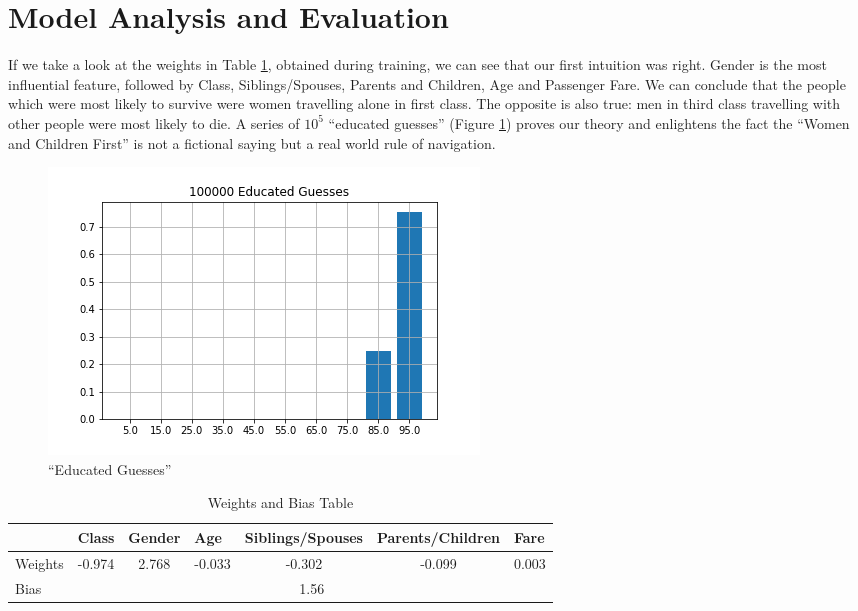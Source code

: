 \documentclass[10pt,a4paper]{report}
\begin{document}
\section{Model Analysis and Evaluation}
If we take a look at the weights in Table \ref{tab:1}, obtained during training, we can see that our first intuition was right. Gender is the most influential feature, followed by Class, Siblings/Spouses, Parents and Children, Age and Passenger Fare. We can conclude that the people which were most likely to survive were women travelling alone in first class. The opposite is also true: men in third class travelling with other people were most likely to die. A series of $10^5$ \enquote{educated guesses} (Figure \ref{fig:ed_guess}) proves our theory and enlightens the fact the \enquote{Women and Children First} is not a fictional saying but a real world rule of navigation.
\begin{figure}[!ht]
\centering
\includegraphics[width=0.5\linewidth]{ed_guess.png}
\caption{\enquote{Educated Guesses}}
\label{fig:ed_guess}
\end{figure}
\begin{table}[!ht]
\centering
\begin{tabular}{|l|c|l|l|l|l|l|}
\hline
        & \multicolumn{1}{l|}{Class} & Gender                     & Age                         & Siblings/Spouses            & Parents/Children            & Fare                       \\ \hline
Weights & -0.974                     & \multicolumn{1}{c|}{2.768} & \multicolumn{1}{c|}{-0.033} & \multicolumn{1}{c|}{-0.302} & \multicolumn{1}{c|}{-0.099} & \multicolumn{1}{c|}{0.003} \\ \hline
Bias    & \multicolumn{6}{c|}{1.56}                                                                                                                                                      \\ \hline
\end{tabular}
\caption{Weights and Bias Table}
\label{tab:1}
\end{table} 
\end{document}
